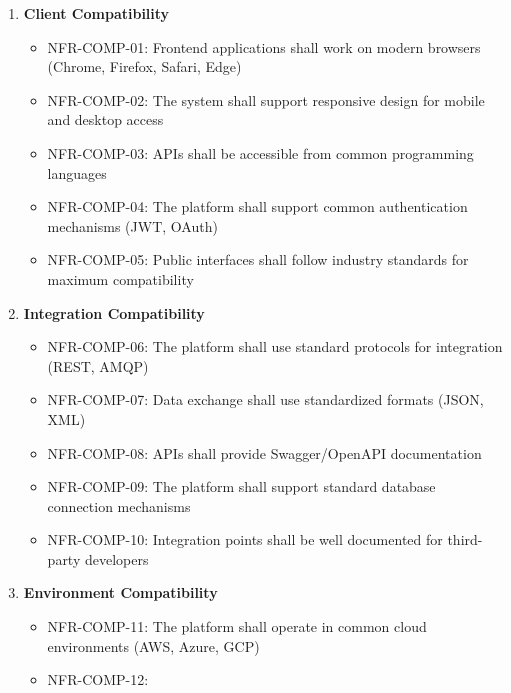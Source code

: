 \begin{enumerate}
   \item \textbf{Client Compatibility}
   \begin{itemize}
      \item NFR-COMP-01: Frontend applications shall work on modern browsers (Chrome, Firefox, Safari, Edge)
      \item NFR-COMP-02: The system shall support responsive design for mobile and desktop access
      \item NFR-COMP-03: APIs shall be accessible from common programming languages
      \item NFR-COMP-04: The platform shall support common authentication mechanisms (JWT, OAuth)
      \item NFR-COMP-05: Public interfaces shall follow industry standards for maximum compatibility
   \end{itemize}

   \item \textbf{Integration Compatibility}
   \begin{itemize}
      \item NFR-COMP-06: The platform shall use standard protocols for integration (REST, AMQP)
      \item NFR-COMP-07: Data exchange shall use standardized formats (JSON, XML)
      \item NFR-COMP-08: APIs shall provide Swagger/OpenAPI documentation
      \item NFR-COMP-09: The platform shall support standard database connection mechanisms
      \item NFR-COMP-10: Integration points shall be well documented for third-party developers
   \end{itemize}

   \item \textbf{Environment Compatibility}
   \begin{itemize}
      \item NFR-COMP-11: The platform shall operate in common cloud environments (AWS, Azure, GCP)
      \item NFR-COMP-12:
     \end{itemize}
  
   \end{enumerate}




